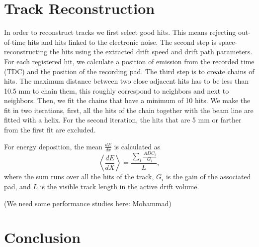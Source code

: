 \documentclass[twocolumn,showpacs,superscriptaddress,groupedaddress]{revtex4}
\begin{document}

\section{Track Reconstruction}\label{sec_perf}

In order to reconstruct tracks we first select good hits. This means rejecting 
out-of-time hits and hits linked to the electronic noise. The second step is 
space-reconstructing the hits using the extracted drift speed and drift path 
parameters. For each registered hit, we calculate a position of emission from 
the recorded time (TDC) and the position of the recording pad. The third step 
is to create chains of hits. The maximum distance between two close adjacent 
hits has to be less than 10.5 mm to chain them, this roughly correspond to 
neighbors and next to neighbors. Then, we fit the chains that have a minimum of 
10 hits. We make the fit in two iterations, first, all the hits of the chain 
together with the beam line are fitted with a helix. For the second iteration, 
the hits that are 5 mm or farther from the first fit are excluded.

For energy deposition, the mean $\frac{dE}{dx}$ is calculated as
\begin{equation}
 \left\langle \frac{dE}{dX} \right\rangle= \frac{\sum\limits_{i} \frac{ADC_{i}}{G_i}}{L},
\end{equation}
where the sum runs over all the hits of the track, $G_{i}$ is the gain of 
the associated pad, and $L$ is the visible track length in the active drift 
volume. 

(We need some performance studies here: Mohammad)

\section{Conclusion}




  
\end{document}
